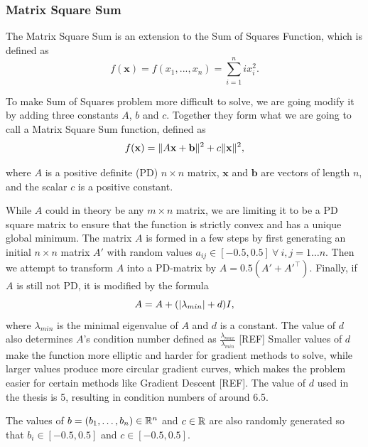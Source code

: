 \documentclass[a4paper,english,titlepage,12pt]{article}
\newcommand{\vect}[1]{\ensuremath{\mathbf{#1}}}
\newcommand{\norm}[1]{\ensuremath\Vert #1 \Vert}
\newcommand{\abs}[1]{\ensuremath|#1|}
\newcommand{\R}{\ensuremath\mathbb{R}}
\begin{document}
\subsubsection{Matrix Square Sum}
\label{sect:matrix_square_sum}


The Matrix Square Sum is an extension to the Sum of Squares Function, which is defined as
\begin{equation}
    f(\mathbf{x})=f(x_1, ..., x_n)=\sum_{i=1}^{n}{ix_i^2}.
\end{equation}

To make Sum of Squares problem more difficult to solve, we are going modify it by adding three constants $A$, $b$ and $c$. Together they form what we are going to call a Matrix Square Sum function, defined as
\begin{equation}
    f(\vect{x}) = \norm{A \vect{x} + \vect{b}} ^ 2 + c \norm{\vect{x}} ^ 2,
\end{equation}

where $A$ is a positive definite (PD) $n \times n$ matrix, $\vect{x}$ and $\vect{b}$ are vectors of length $n$, and the scalar $c$ is a positive constant.

While $A$ could in theory be any $m \times n$ matrix, we are limiting it to be a PD square matrix to ensure that the function is strictly convex and has a unique global minimum. The matrix $A$ is formed in a few steps by first generating an initial $n \times n$ matrix $A'$ with random values $a_{ij} \in [-0.5, 0.5]\ \forall\ i,j = 1 \dots n$. Then we attempt to transform $A$ into a PD-matrix by $A = 0.5 (A' + A'^\top)$. Finally, if  $A$ is still not PD, it is modified by the formula 
\begin{equation}
    A = A + (\abs{\lambda_{min}} + d) I,
\end{equation}
where $\lambda_{min}$ is the minimal eigenvalue of $A$ and $d$ is a constant. The value of $d$ also determines $A$'s condition number defined as $\frac{\lambda_{max}}{\lambda_{min}}$ [REF] Smaller values of $d$ make the function more elliptic and harder for gradient methods to solve, while larger values produce more circular gradient curves, which makes the problem easier for certain methods like Gradient Descent [REF]. The value of $d$ used in the thesis is 5, resulting in condition numbers of around 6.5.

The values of $b = (b_1,\dots,b_n) \in \R^n$ and $c\in \R$ are also randomly generated so that $b_i \in [-0.5, 0.5]$ and $c \in [-0.5, 0.5]$.
\end{document}
